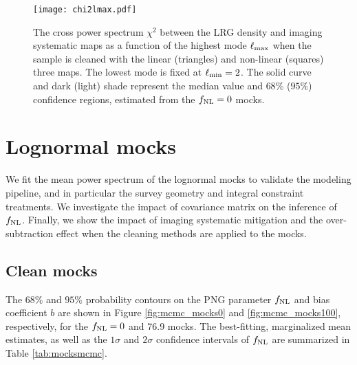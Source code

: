 \begin{figure}
\centering
\texttt{[image: chi2lmax.pdf]}
\caption{The cross power spectrum $\chi^{2}$ between the LRG density and imaging systematic maps as a function of the highest mode $\ell_{\rm max}$ when the sample is cleaned with the linear (triangles) and non-linear (squares) three maps. The lowest mode is fixed at $\ell_{\rm min}=2$. The solid curve and dark (light) shade represent the median value and $68\%$ ($95\%$) confidence regions, estimated from the $f_{\rm NL}=0$ mocks.}\label{fig:chi2cellextend}
\end{figure}

\section{Lognormal mocks}
We fit the mean power spectrum of the lognormal mocks to validate the modeling pipeline, and in particular the survey geometry and integral constraint treatments. We investigate the impact of covariance matrix on the inference of $f_{\rm NL}$. Finally, we show the impact of imaging systematic mitigation and the over-subtraction effect when the cleaning methods are applied to the mocks. 

\subsection{Clean mocks}
The $68\%$ and $95\%$ probability contours on the PNG parameter $f_{\rm NL}$ and bias coefficient $b$ are shown in Figure \ref{fig:mcmc_mocks0} and \ref{fig:mcmc_mocks100}, respectively, for the $f_{\rm NL}=0$ and 76.9 mocks. The best-fitting, marginalized mean estimates, as well as the $1\sigma$ and $2\sigma$ confidence intervals of $f_{\rm NL}$ are summarized in Table \ref{tab:mocksmcmc}. 


